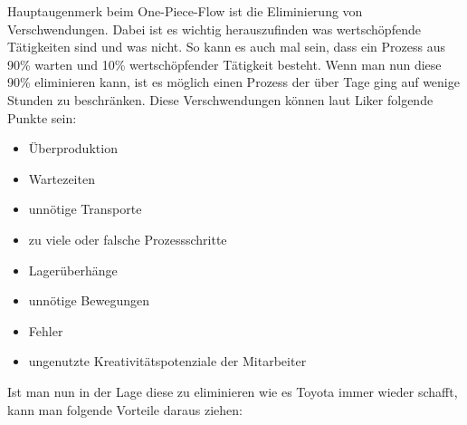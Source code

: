 \documentclass[a4paper,12pt]{scrartcl}
\begin{document}
Hauptaugenmerk beim One-Piece-Flow ist die Eliminierung von Verschwendungen. Dabei ist es wichtig herauszufinden was wertschöpfende Tätigkeiten sind und was nicht. So kann es auch mal sein, dass ein Prozess aus 90\% warten und 10\% wertschöpfender Tätigkeit besteht. Wenn man nun diese 90\% eliminieren kann, ist es möglich einen Prozess der über Tage ging auf wenige Stunden zu beschränken. Diese Verschwendungen können laut Liker folgende Punkte sein:

\begin{itemize}
    \item Überproduktion
    \item Wartezeiten
    \item unnötige Transporte
    \item zu viele oder falsche Prozessschritte
    \item Lagerüberhänge
    \item unnötige Bewegungen
    \item Fehler
    \item ungenutzte Kreativitätspotenziale der Mitarbeiter
\end{itemize}

Ist man nun in der Lage diese zu eliminieren wie es Toyota immer wieder schafft, kann man folgende Vorteile daraus ziehen:
\end{document}
